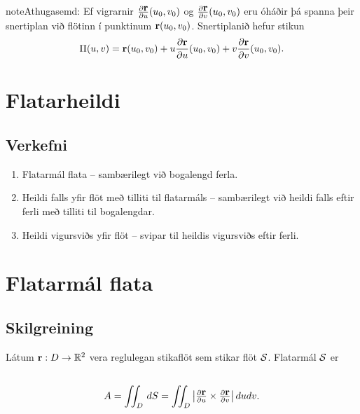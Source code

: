 \documentclass[a4paper,10pt,icelandic]{sphinxmanual}
\begin{document}
\begin{notice}{note}{Athugasemd:}
Ef vigrarnir \(\frac{\partial \mbox{${\bf r}$}}{\partial u}(u_0,v_0)\) og \(\frac{\partial\mbox{${\bf r}$}}{\partial v}(u_0,v_0)\) eru óháðir þá spanna þeir snertiplan við flötinn í punktinum \(\mbox{${\bf r}$}(u_0,v_0)\). Snertiplanið hefur stikun
\begin{gather}
\begin{split}\displaystyle
\Pi(u,v) = \mbox{${\bf r}$}(u_0,v_0)+u\frac{\partial \mbox{${\bf r}$}}{\partial u}(u_0,v_0)+v\frac{\partial \mbox{${\bf r}$}}{\partial v}(u_0,v_0).\end{split}\notag
\end{gather}\end{notice}


\section{Flatarheildi}
\label{Kafli5:flatarheildi}

\subsection{Verkefni}
\label{Kafli5:verkefni}\begin{enumerate}
\item {} 
Flatarmál flata – sambærilegt við bogalengd ferla.

\item {} 
Heildi falls yfir flöt með tilliti til flatarmáls – sambærilegt við
heildi falls eftir ferli með tilliti til bogalengdar.

\item {} 
Heildi vigursviðs yfir flöt – svipar til heildis vigursviðs eftir
ferli.

\end{enumerate}


\section{Flatarmál flata}
\label{Kafli5:flatarmal-flata}

\subsection{Skilgreining}
\label{Kafli5:id19}
Látum \(\mbox{${\bf r}$}:D\rightarrow {\mathbb  R}^2\) vera
reglulegan stikaflöt sem stikar flöt \(\cal S\). Flatarmál
\(\cal S\) er
\begin{gather}
\begin{split}\displaystyle\end{split}\notag\\\begin{split}A=\int\!\!\!\int_D\,dS=\int\!\!\!\int_D \big|{\textstyle\frac{\partial \mbox{${\bf r}$}}{\partial u}
\times\frac{\partial \mbox{${\bf r}$}}{\partial v}}\big|\,dudv.\end{split}\notag
\end{gather}
\end{document}
